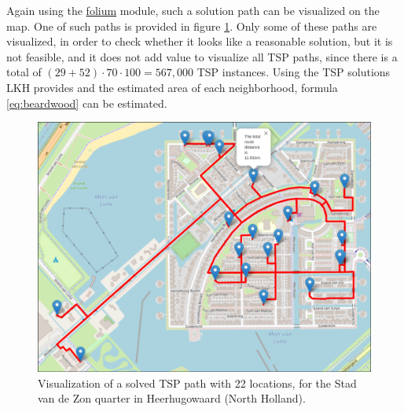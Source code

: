 Again using the \url{folium} module, such a solution path can be visualized on the map. One of such
paths is provided in figure \ref{fig:tsp_stadvdzon}. Only some of these paths are visualized,
in order to check whether it looks like a reasonable solution, but it is not feasible, and it does
not add value to visualize all TSP paths, since there is a total of 
$(29+52)\cdot70\cdot100=567,000$ TSP instances.
Using the TSP solutions LKH provides and the estimated area of each neighborhood, formula 
\ref{eq:beardwood} can be estimated.
\begin{figure}[H]
  \caption{Visualization of a solved TSP path with 22 locations, for the Stad van de Zon quarter in 
  Heerhugowaard (North Holland).}
  \label{fig:tsp_stadvdzon}
  \includegraphics[width=\textwidth]{Pictures/TSP_22_Stad_van_de_Zon.png}
\end{figure}
